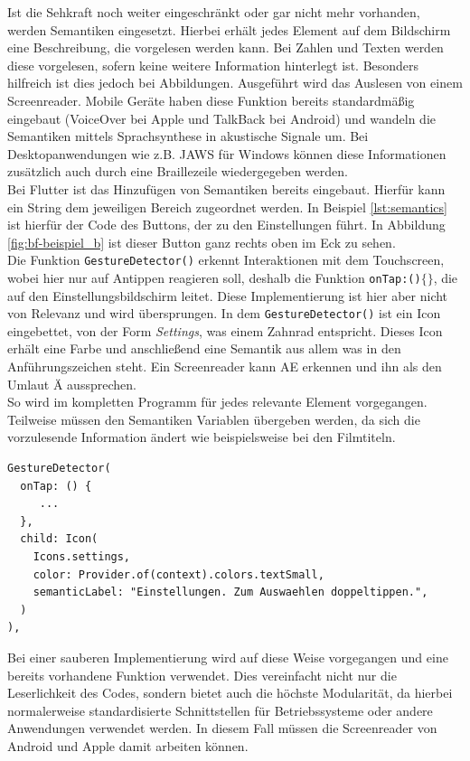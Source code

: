 \noindent
Ist die Sehkraft noch weiter eingeschränkt oder gar nicht mehr vorhanden, werden Semantiken eingesetzt. Hierbei erhält jedes Element auf dem Bildschirm eine Beschreibung, die vorgelesen werden kann. Bei Zahlen und Texten werden diese vorgelesen, sofern keine weitere Information hinterlegt ist. Besonders hilfreich ist dies jedoch bei Abbildungen. Ausgeführt wird das Auslesen von einem Screenreader. Mobile Geräte haben diese Funktion bereits standardmäßig eingebaut (VoiceOver bei Apple und TalkBack bei Android) und wandeln die Semantiken mittels Sprachsynthese in akustische Signale um. Bei Desktopanwendungen wie z.B. JAWS für Windows können diese Informationen zusätzlich auch durch eine Braillezeile wiedergegeben werden.\\
Bei Flutter ist das Hinzufügen von Semantiken bereits eingebaut. Hierfür kann ein String dem jeweiligen Bereich zugeordnet werden. In Beispiel \ref{lst:semantics} ist hierfür der Code des Buttons, der zu den Einstellungen führt. In Abbildung \ref{fig:bf-beispiel_b} ist dieser Button ganz rechts oben im Eck zu sehen.\\
Die Funktion \texttt{GestureDetector()} erkennt Interaktionen mit dem Touchscreen, wobei hier nur auf Antippen reagieren soll, deshalb die Funktion \texttt{onTap:()$\{\}$}, die auf den Einstellungsbildschirm leitet. Diese Implementierung ist hier aber nicht von Relevanz und wird übersprungen. In dem \texttt{GestureDetector()} ist ein Icon eingebettet, von der Form \textit{Settings}, was einem Zahnrad entspricht. Dieses Icon erhält eine Farbe und anschließend eine Semantik aus allem was in den Anführungszeichen steht. Ein Screenreader kann AE erkennen und ihn als den Umlaut Ä aussprechen. \\
So wird im kompletten Programm für jedes relevante Element vorgegangen. Teilweise  müssen den Semantiken Variablen übergeben werden, da sich die vorzulesende Information ändert wie beispielsweise bei den Filmtiteln.
    
\begin{lstlisting}[caption=Codeausschnitt in Dart von einem Button mit Semantiken,label=lst:semantics]
GestureDetector(
  onTap: () {
     ...
  },
  child: Icon(
    Icons.settings,
    color: Provider.of(context).colors.textSmall,
    semanticLabel: "Einstellungen. Zum Auswaehlen doppeltippen.",
  )
),
\end{lstlisting}

\noindent
Bei einer sauberen Implementierung wird auf diese Weise vorgegangen und eine bereits vorhandene Funktion verwendet. Dies vereinfacht nicht nur die Leserlichkeit des Codes, sondern bietet auch die höchste Modularität, da hierbei normalerweise standardisierte Schnittstellen für Betriebssysteme oder andere Anwendungen verwendet werden. In diesem Fall  müssen die Screenreader von Android und Apple damit arbeiten können.\\

